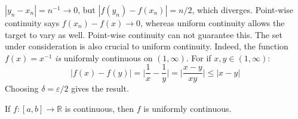             $|y_{n}-x_{n}|=n^{-1}\rightarrow{0}$, but
            $|f(y_{n})-f(x_{n})|=n/2$, which diverges.
            Point-wise continuity says
            $f(x_{n})-f(x)\rightarrow{0}$, whereas
            uniform continuity allows the target to
            vary as well. Point-wise continuity can
            not guarantee this. The set under consideration is
            also crucial to uniform continuity. Indeed,
            the function $f(x)=x^{-1}$ \textit{is} uniformly
            continuous on $(1,\infty)$. For if $x,y\in(1,\infty)$:
            \begin{equation}
                |f(x)-f(y)|=\Big|\frac{1}{x}-\frac{1}{y}\Big|
                =\Big|\frac{x-y}{xy}\Big|\leq|x-y|
            \end{equation}
            Choosing $\delta=\varepsilon/2$ gives the result.
            \begin{theorem}
                \label{thm:FUNCTIONAL_ANALYSIS:CONT_ON_CLOSED_INTERVAL}
                If $f:[a,b]\rightarrow\mathbb{R}$ is continuous,
                then $f$ is uniformly continuous.
            \end{theorem}
